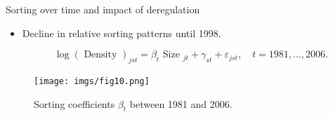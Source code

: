 \documentclass[notes,10pt, aspectratio=169]{beamer}
\begin{document}
    \begin{frame}{Sorting over time and impact of deregulation}\label{sorting_time}
    \begin{itemize}
        \item Decline in relative sorting patterns until 1998.  %
\hyperlink{stag_time}{}
    
    $$
    \log (\text { Density })_{j s t}=\beta_t \text { Size }_{j t}+\gamma_{s t}+\varepsilon_{j s t}, \quad t=1981, \ldots, 2006 .
    $$
    \end{itemize}
    
    
    \begin{figure}
        \centering
        \texttt{[image: imgs/fig10.png]}
        \caption*{Sorting coefficients $\beta_t$ between 1981 and 2006.}
        \label{fig:my_label}
    \end{figure}
    
    \end{frame}

    
\end{document}
